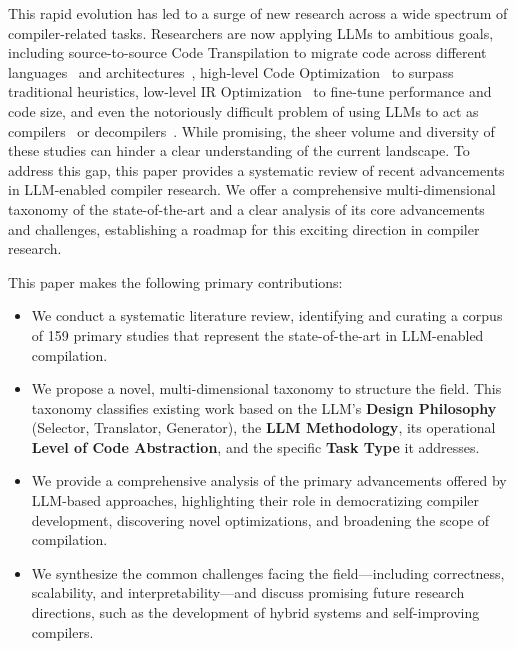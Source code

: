 \documentclass[pdflatex,sn-mathphys-ay,twocolumn, a4paper]{sn-jnl}%
\theoremstyle{thmstyleone}%
\theoremstyle{thmstyletwo}%
\theoremstyle{thmstylethree}%
\begin{document}
This rapid evolution has led to a surge of new research across a wide spectrum of compiler-related tasks. Researchers are now applying LLMs to ambitious goals, including source-to-source Code Transpilation to migrate code across different languages~\citep{177_transcoder, 38_jana2024cotran, 60_zhang2025_pldi, 91_alphatrans2025_fse} and architectures~\citep{153_babeltower2022_icml, 174_coderosseta2024_neurips, 74_palkowski2024automatic, 10_qimengxpiler2025_osdi}, high-level Code Optimization~\citep{17_gao2025search, 52_peng2025perfcodegen,58_purschke2025speedgen,63_xu2025efficient, 12_lin2025eco} to surpass traditional heuristics, low-level IR Optimization~\citep{11_deng2024compilerdream_arxiv,metallmcompiler-cc25,51_decos2025_ics} to fine-tune performance and code size, and even the notoriously difficult problem of using LLMs to act as compilers~\citep{71_gao-etal-2024-virtual, 70_c-x86-emnlp24, 44_vega2025_cgo} or decompilers~\citep{130_xu2023lmpa,72_armengol2024slade,73_tan-etal-2024-llm4decompile,75_hu2024degpt,173_wong2025decllm}. While promising, the sheer volume and diversity of these studies can hinder a clear understanding of the current landscape. 
To address this gap, this paper provides a systematic review of recent advancements in LLM-enabled compiler research. We offer a comprehensive multi-dimensional taxonomy of the state-of-the-art and a clear analysis of its core advancements and challenges, establishing a roadmap for this exciting direction in compiler research.


This paper makes the following primary contributions:

\begin{itemize}
\item We conduct a systematic literature review, identifying and curating a corpus of 159 primary studies that represent the state-of-the-art in LLM-enabled compilation.
\item We propose a novel, multi-dimensional taxonomy to structure the field. This taxonomy classifies existing work based on the LLM's \textbf{Design Philosophy} (Selector, Translator, Generator), the \textbf{LLM Methodology}, its operational \textbf{Level of Code Abstraction}, and the specific \textbf{Task Type} it addresses.

\item We provide a comprehensive analysis of the primary advancements offered by LLM-based approaches, highlighting their role in democratizing compiler development, discovering novel optimizations, and broadening the scope of compilation.

\item We synthesize the common challenges facing the field—including correctness, scalability, and interpretability—and discuss promising future research directions, such as the development of hybrid systems and self-improving compilers.
\end{itemize}
\end{document}
